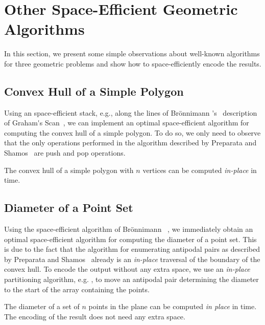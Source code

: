 
\section{Other Space-Efficient Geometric Algorithms}

In this section, we present some simple observations about well-known
algorithms for three geometric problems and show how to space-efficiently
encode the results.

\subsection{Convex Hull of a Simple Polygon}

Using an space-efficient stack, e.g., along the lines of Br\"onnimann
\etal\'{}s~\cite{bronnimann:convex} description of Graham\'{}s
Scan~\cite{graham:efficient}, we can implement an optimal
space-efficient algorithm for computing the convex hull of a simple
polygon. To do so, we only need to observe that the only operations
performed in the algorithm described by Preparata and
Shamos~\cite[Chap. 4.1.4]{preparata:computational} are push and pop
operations.

\begin{lemma}
  The convex hull of a simple polygon with $n$ vertices can
  be computed \emph{in-place} in  time.
\end{lemma}

\subsection{Diameter of a Point Set}

Using the space-efficient algorithm of Br\"onnimann
\etal~\cite{bronnimann:convex}, we immediately obtain an optimal
space-efficient algorithm for computing the diameter of a point set.
This is due to the fact that the algorithm for enumerating antipodal
pairs as described by Preparata and
Shamos~\cite[Chap. 4.2.3]{preparata:computational} already is an
\emph{in-place} traversal of the boundary of the convex hull. To
encode the output without any extra space, we use an \emph{in-place}
partitioning algorithm, e.g. \cite{katajainen:partitioning}, to move
an antipodal pair determining the diameter to the start of the array
containing the points.

\begin{lemma}
  The diameter of a set of $n$ points in the plane can be computed
  \emph{in place} in  time. The encoding of the result
  does not need any extra space.
\end{lemma}

